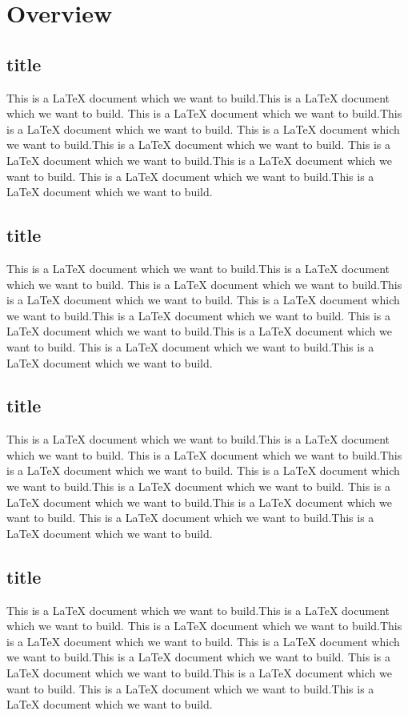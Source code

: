 \documentclass{book}
\begin{document}
    \chapter{Overview}
    \section{title}
    This is a LaTeX document which we want to build.This is a LaTeX document which we want to build.
    This is a LaTeX document which we want to build.This is a LaTeX document which we want to build.
    This is a LaTeX document which we want to build.This is a LaTeX document which we want to build.
    This is a LaTeX document which we want to build.This is a LaTeX document which we want to build.
    This is a LaTeX document which we want to build.This is a LaTeX document which we want to build.
    \section{title}
    This is a LaTeX document which we want to build.This is a LaTeX document which we want to build.
    This is a LaTeX document which we want to build.This is a LaTeX document which we want to build.
    This is a LaTeX document which we want to build.This is a LaTeX document which we want to build.
    This is a LaTeX document which we want to build.This is a LaTeX document which we want to build.
    This is a LaTeX document which we want to build.This is a LaTeX document which we want to build.
    \section{title}
    This is a LaTeX document which we want to build.This is a LaTeX document which we want to build.
    This is a LaTeX document which we want to build.This is a LaTeX document which we want to build.
    This is a LaTeX document which we want to build.This is a LaTeX document which we want to build.
    This is a LaTeX document which we want to build.This is a LaTeX document which we want to build.
    This is a LaTeX document which we want to build.This is a LaTeX document which we want to build.
    \section{title}
    This is a LaTeX document which we want to build.This is a LaTeX document which we want to build.
    This is a LaTeX document which we want to build.This is a LaTeX document which we want to build.
    This is a LaTeX document which we want to build.This is a LaTeX document which we want to build.
    This is a LaTeX document which we want to build.This is a LaTeX document which we want to build.
    This is a LaTeX document which we want to build.This is a LaTeX document which we want to build.
\end{document}
